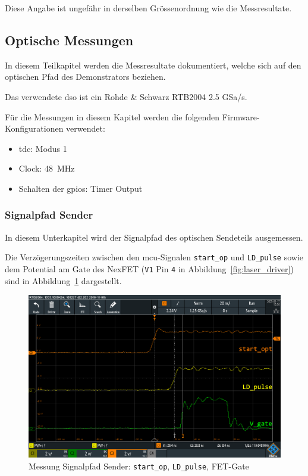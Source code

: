Diese Angabe ist ungefähr in derselben Grössenordnung wie die Messresultate.

\pagebreak

\subsection{Optische Messungen}

In diesem Teilkapitel werden die Messresultate dokumentiert, welche sich auf den optischen Pfad des Demonstrators
beziehen.

Das verwendete \acrshort{dso} ist ein Rohde \& Schwarz RTB2004 2.5 GSa/s.

Für die Messungen in diesem Kapitel werden die folgenden Firmware-Konfigurationen verwendet:

\begin{itemize}
    \item \acrshort{tdc}: Modus 1
    \item Clock: 48~MHz
    \item Schalten der \acrshort{gpio}s: Timer Output
\end{itemize}

\subsubsection{Signalpfad Sender}\label{sec:messungen_signalpfad_sender}

In diesem Unterkapitel wird der Signalpfad des optischen Sendeteils ausgemessen.

Die Verzögerungszeiten zwischen den \acrshort{mcu}-Signalen \lstinline|start_op| und \lstinline|LD_pulse| sowie dem
Potential am Gate des NexFET (\lstinline|V1| Pin \lstinline|4| in Abbildung~\ref{fig:laser_driver}) sind in
Abbildung~\ref{fig:signalpfad_sender_startopt_ldpulse_fetgate} dargestellt.

\begin{figure}[H]
    \centering
    \includegraphics[width=\textwidth]{graphics/signalpfad_sender_startopt_ldpulse_fetgate.png}
    \caption{Messung Signalpfad Sender: \lstinline|start_op|, \lstinline|LD_pulse|, FET-Gate}\label{fig:signalpfad_sender_startopt_ldpulse_fetgate}
\end{figure}

